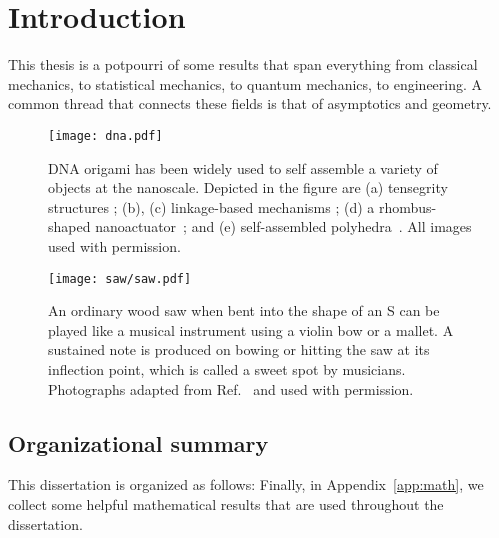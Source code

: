
\chapter{Introduction}

This thesis is a potpourri of some results that span everything from classical mechanics, to statistical mechanics, to quantum mechanics, to engineering.
A common thread that connects these fields is that of asymptotics and geometry.

\begin{figure}
  \begin{center}
    \texttt{[image: dna.pdf]}
  \end{center}
  \caption{DNA origami has been widely used to self assemble a variety of objects at the nanoscale.
    Depicted in the figure are (a) tensegrity structures \cite{liedl2010}; (b), (c) linkage-based mechanisms \cite{marras2015,zhou2015}; (d) a rhombus-shaped nanoactuator~\cite{ke2016}; and (e) self-assembled polyhedra~\cite{iinuma2014}.  All images used with permission.}
  \label{fig:dna_origami}
\end{figure}

\begin{figure}
  \begin{center}
    \texttt{[image: saw/saw.pdf]}
  \end{center}
  \caption{%
    An ordinary wood saw when bent into the shape of an S can be played like a musical instrument using a violin bow or a mallet.
    A sustained note is produced on bowing or hitting the saw at its inflection point, which is called a sweet spot by musicians.
    Photographs adapted from Ref.~\cite{shankar2022} and used with permission.
  }
  \label{fig:saw}
\end{figure}

\section{Organizational summary}

This dissertation is organized as follows:
Finally, in Appendix~\ref{app:math}, we collect some helpful mathematical results that are used throughout the dissertation.
